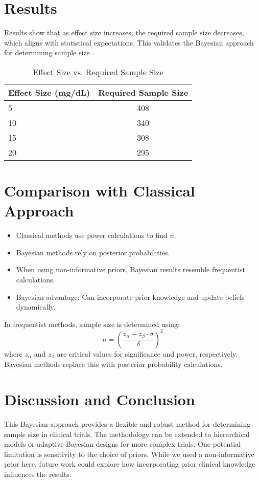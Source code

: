 \documentclass{article}
\begin{document}
	\section{Results}
	Results show that as effect size increases, the required sample size decreases, which aligns with statistical expectations. This validates the Bayesian approach for determining sample size \cite{Lee2023}.
	
	\begin{table}[h]
		\centering
		\begin{tabular}{lc}
			\toprule
			\textbf{Effect Size (mg/dL)} & \textbf{Required Sample Size} \\
			\midrule
			5  & 408 \\
			10 & 340 \\
			15 & 308 \\
			20 & 295 \\
			\bottomrule
		\end{tabular}
		\caption{Effect Size vs. Required Sample Size}
		\label{tab:results}
	\end{table}
	
	\section{Comparison with Classical Approach}
	\begin{itemize}
		\item Classical methods use power calculations to find $n$.
		\item Bayesian methods rely on posterior probabilities.
		\item When using non-informative priors, Bayesian results resemble frequentist calculations.
		\item Bayesian advantage: Can incorporate prior knowledge and update beliefs dynamically.
	\end{itemize}
	
	In frequentist methods, sample size is determined using:
	\begin{equation}
		n = \left( \frac{z_{\alpha} + z_{\beta} \cdot \sigma}{\delta} \right)^2
	\end{equation}
	where $z_{\alpha}$ and $z_{\beta}$ are critical values for significance and power, respectively. Bayesian methods replace this with posterior probability calculations.
	
	\section{Discussion and Conclusion}
	This Bayesian approach provides a flexible and robust method for determining sample size in clinical trials. The methodology can be extended to hierarchical models or adaptive Bayesian designs for more complex trials. One potential limitation is sensitivity to the choice of priors. While we used a non-informative prior here, future work could explore how incorporating prior clinical knowledge influences the results.
	
\end{document}
